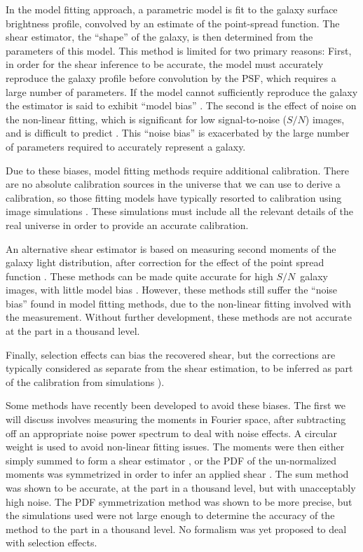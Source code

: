 \documentclass[iop]{emulateapj}
\newcommand{\snr}{$S/N$}
\begin{document}
In the model fitting approach, a parametric model is fit to the galaxy surface
brightness profile, convolved by an estimate of the point-spread function.
The shear estimator, the ``shape'' of the galaxy, is then determined
from the parameters of this model.  This method is limited for two primary
reasons: First, in order for the shear inference to be accurate, the model
must accurately reproduce the galaxy profile before convolution by the
PSF, which requires a large number of parameters.  If the model
cannot sufficiently reproduce the galaxy the estimator is said to exhibit
``model bias'' \citep{Bernstein2010}.  The second is the effect of noise
on the non-linear fitting, which is significant for low signal-to-noise (\snr)
images, and is difficult to predict
\citep{HirataAlign04,Refreg12,Melchior12}.  This ``noise bias'' is exacerbated
by the large number of parameters required to accurately represent a galaxy.

Due to these biases, model fitting methods require additional calibration.
There are no absolute calibration sources in the universe that we can use to
derive a calibration, so those fitting models have typically resorted to
calibration using image simulations
\citep[e.g.][]{Zuntz13,Miller13,KidsShear2016}.  These simulations must include
all the relevant details of the real universe in order to provide an accurate
calibration.

An alternative shear estimator is based on measuring second moments of the
galaxy light distribution, after correction for the effect of the point spread
function \citep[e.g.][]{ksb95,Bernstein2010}.  These methods can be made quite
accurate for high \snr\ galaxy images, with little model bias
\citep{Bernstein2010,Okura2016}.  However, these methods still suffer the
``noise bias'' found in model fitting methods, due to the non-linear fitting
involved with the measurement.  Without further development, these methods are
not accurate at the part in a thousand level.

Finally, selection effects can bias the recovered shear, but the corrections
are typically considered as separate from the shear estimation, to be inferred
as part of the calibration from simulations \citep{Jarvis2016,KidsShear2016}).

Some methods have recently been developed to avoid these biases.  The first we
will discuss \citep{Zhang2017} involves measuring the moments in Fourier space,
after subtracting off an appropriate noise power spectrum to deal with noise
effects.  A circular weight is used to avoid non-linear fitting issues.  The
moments were then either simply summed to form a shear estimator
\citep{Zhang2015}, or the PDF of the un-normalized moments was symmetrized in
order to infer an applied shear \citep{Zhang2017}.  The sum method was shown to
be accurate, at the part in a thousand level, but with unacceptably high noise.
The PDF symmetrization method was shown to be more precise, but the simulations
used were not large enough to determine the accuracy of the method to the part
in a thousand level.  No formalism was yet proposed to deal with selection
effects. 
\end{document}
